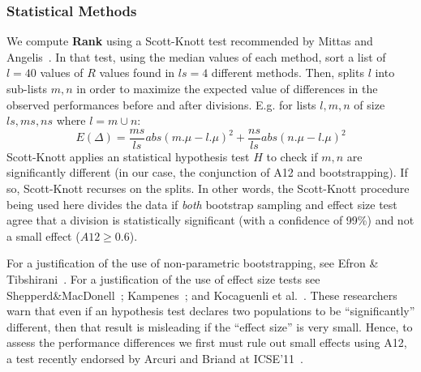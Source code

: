 \documentclass{sig-alternate}
\begin{document}
  \subsubsection{Statistical Methods}
  We compute {\bf Rank} using a Scott-Knott test recommended by Mittas and  Angelis~\cite{mittas13}. 
In that test, using the median values of each method,  
sort a list of  $l=40$ values of $R$ values found in  $ls=4$ different methods. 
Then,
splits $l$ into sub-lists $m,n$ in order to maximize the expected value of
 differences  in the observed performances
before and after divisions. E.g. for lists $l,m,n$ of size $ls,ms,ns$ where $l=m\cup n$:
 \[E(\Delta)=\frac{ms}{ls}abs(m.\mu - l.\mu)^2 + \frac{ns}{ls}abs(n.\mu - l.\mu)^2\]
Scott-Knott  applies an statistical  hypothesis test $H$ to check
if $m,n$ are significantly different  (in our case, the conjunction of A12 and bootstrapping). 
If so, Scott-Knott  recurses on the splits.
In other words, the Scott-Knott procedure being used here divides the data if \textit{both} bootstrap sampling and effect size test agree that a division is statistically significant (with a confidence of 99\%) and not a small effect ($A12 \ge 0.6$).

For a justification of the use of non-parametric bootstrapping, see Efron \& Tibshirani~\cite[p220-223]{efron93}. For a justification of the use of effect size tests see Shepperd\&MacDonell~\cite{shepperd12a}; Kampenes~\cite{kampenes07}; and Kocaguenli et al.~\cite{Kocaguneli2013:ep}. These researchers warn that even if an hypothesis test declares two populations to be ``significantly'' different, then that result is misleading if the ``effect size'' is very small. Hence, to assess the performance differences we first must rule out small effects using A12, a test   recently endorsed by Arcuri and Briand at ICSE'11~\cite{arcuri11}.




\end{document}
